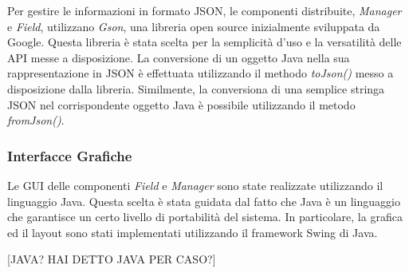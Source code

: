 Per gestire le informazioni in formato JSON, le componenti distribuite, \emph{Manager} e \emph{Field}, utilizzano \emph{Gson}, una libreria open source  inizialmente sviluppata da Google. Questa libreria \`{e} stata scelta per la semplicit\`{a} d'uso e la versatilit\`{a} delle API messe a disposizione. La conversione di un oggetto Java nella sua rappresentazione in JSON \`{e} effettuata utilizzando il methodo \emph{toJson()} messo a disposizione dalla libreria. Similmente, la conversiona di una semplice stringa JSON nel corrispondente oggetto Java \`{e} possibile utilizzando il metodo \emph{fromJson()}.

\subsubsection{Interfacce Grafiche}
Le GUI delle componenti \emph{Field} e \emph{Manager} sono state realizzate utilizzando il linguaggio Java. Questa scelta \`{e} stata guidata dal fatto che Java \`{e} un linguaggio che garantisce un certo livello di portabilit\`{a} del sistema. In particolare, la grafica ed il layout sono stati implementati utilizzando il framework Swing di Java.

[JAVA? HAI DETTO JAVA PER CASO?]